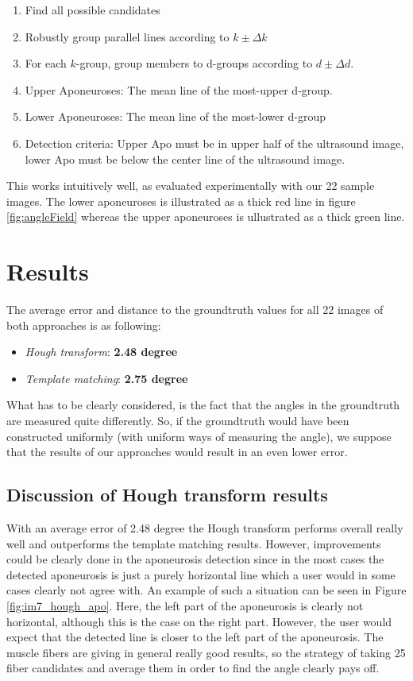 \documentclass[10pt,twocolumn,letterpaper]{article}
\begin{document}
\begin{enumerate}
	\item Find all possible candidates
	\item Robustly group parallel lines according to $k \pm \Delta k$
	\item For each $k$-group, group members to d-groups according to $d \pm \Delta d$.
	\item Upper Aponeuroses: The mean line of the most-upper d-group.
	\item Lower Aponeuroses: The mean line of the most-lower d-group  
	\item Detection criteria: Upper Apo must be in upper half of the ultrasound image, lower Apo must be below the center line of the ultrasound image. 
\end{enumerate}

This works intuitively well, as evaluated experimentally with our 22 sample images. The lower aponeuroses is illustrated as a thick red line in figure \ref{fig:angleField} whereas the upper aponeuroses is ullustrated as a thick green line.





\section{Results}
The average error and distance to the groundtruth values for all 22 images of both approaches is as following: 

\begin{itemize}
     \item \emph{Hough transform}: \textbf{2.48 degree}
     \item \emph{Template matching}: \textbf{2.75 degree}
\end{itemize}

What has to be clearly considered, is the fact that the angles in the groundtruth are measured quite differently. So, if the groundtruth would have been constructed uniformly (with uniform ways of measuring the angle), we suppose that the results of our approaches would result in an even lower error.


\subsection{Discussion of Hough transform results}

With an average error of 2.48 degree the Hough transform performs overall really well and outperforms the template matching results. 
However, improvements could be clearly done in the aponeurosis detection since in the most cases the detected aponeurosis is just a purely horizontal line which a user would in some cases clearly not agree with. An example of such a situation can be seen in Figure \ref{fig:im7_hough_apo}. Here, the left part of the aponeurosis is clearly not horizontal, although this is the case on the right part. However, the user would expect that the detected line is closer to the left part of the aponeurosis.
The muscle fibers are giving in general really good results, so the strategy of taking 25 fiber candidates and average them in order to find the angle clearly pays off.
\end{document}
